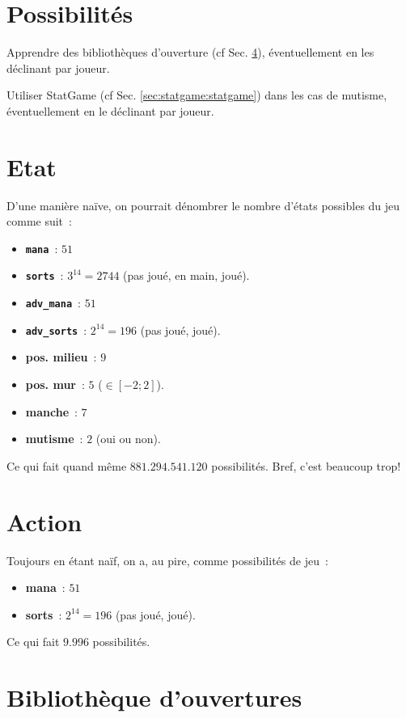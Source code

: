 \def\mana{\verb$mana$}
\def\sorts{\verb$sorts$}
\def\Amana{\verb$adv_mana$}
\def\Asorts{\verb$adv_sorts$}


\section{Possibilités}
\label{sec:possible}

Apprendre des bibliothèques d'ouverture (cf Sec. \ref{sec:bibli_open}), éventuellement en les déclinant par joueur.

Utiliser StatGame (cf Sec. \ref{sec:statgame:statgame}) dans les cas de mutisme, éventuellement en le déclinant par joueur.


\section{Etat}
\label{sec:etat}

D'une manière naïve, on pourrait dénombrer le nombre d'états possibles du jeu comme suit~:
\begin{itemize}
\item{\bf \mana}~: $51$
\item{\bf \sorts}~: $3^{14} = 2744$ (pas joué, en main, joué).
\item{\bf \Amana }~: $51$
\item{\bf \Asorts}~: $2^{14} = 196$ (pas joué, joué).
\item{\bf pos. milieu}~: $9$
\item{\bf pos. mur}~: $5$ ($\in [-2; 2]$).
\item{\bf manche}~: $7$
\item{\bf mutisme}~: $2$ (oui ou non).
\end{itemize}
Ce qui fait quand même $881.294.541.120$ possibilités. Bref, c'est beaucoup trop!

\section{Action}
\label{sec:action}

Toujours en étant naïf, on a, au pire, comme possibilités de jeu~:
\begin{itemize}
\item{\bf mana}~: $51$
\item{\bf sorts}~: $2^{14} = 196$ (pas joué, joué).
\end{itemize}
Ce qui fait $9.996$ possibilités.

\section{Bibliothèque d'ouvertures}
\label{sec:bibli_open}

